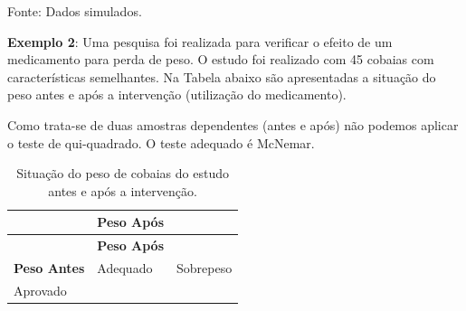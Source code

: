 \documentclass[12pt,portuguese,oneside]{book}
\begin{document}
Fonte: Dados simulados.

\textbf{Exemplo 2}: Uma pesquisa foi realizada para verificar o efeito
de um medicamento para perda de peso. O estudo foi realizado com 45
cobaias com características semelhantes. Na Tabela abaixo são
apresentadas a situação do peso antes e após a intervenção (utilização
do medicamento).

Como trata-se de duas amostras dependentes (antes e após) não podemos
aplicar o teste de qui-quadrado. O teste adequado é McNemar.

\begin{longtable}[]{@{}lll@{}}
\caption{\label{tab:sitcob}Situação do peso de cobaias do estudo antes e
após a intervenção.}\tabularnewline
\toprule
\begin{minipage}[b]{0.35\columnwidth}\raggedright\strut
\strut
\end{minipage} & \begin{minipage}[b]{0.25\columnwidth}\raggedright\strut
\textbf{Peso Após}\strut
\end{minipage} & \begin{minipage}[b]{0.22\columnwidth}\raggedright\strut
\strut
\end{minipage}\tabularnewline
\midrule
\endfirsthead
\toprule
\begin{minipage}[b]{0.35\columnwidth}\raggedright\strut
\strut
\end{minipage} & \begin{minipage}[b]{0.25\columnwidth}\raggedright\strut
\textbf{Peso Após}\strut
\end{minipage} & \begin{minipage}[b]{0.22\columnwidth}\raggedright\strut
\strut
\end{minipage}\tabularnewline
\midrule
\endhead
\begin{minipage}[t]{0.35\columnwidth}\raggedright\strut
\textbf{Peso Antes}\strut
\end{minipage} & \begin{minipage}[t]{0.25\columnwidth}\raggedright\strut
Adequado\strut
\end{minipage} & \begin{minipage}[t]{0.22\columnwidth}\raggedright\strut
Sobrepeso\strut
\end{minipage}\tabularnewline
\begin{minipage}[t]{0.35\columnwidth}\raggedright\strut
Aprovado\strut
\end{minipage} & \begin{minipage}[t]{0.25\columnwidth}\raggedright\strut

\end{minipage}
\end{longtable}
\end{document}
